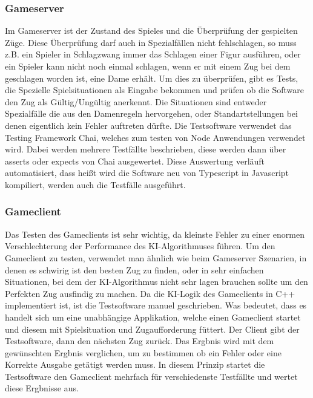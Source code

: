 \documentclass[12pt,a4paper,bibliography=totocnumbered,listof=totocnumbered]{article}
\begin{document}
\subsubsection{Gameserver}
Im Gameserver ist der Zustand des Spieles und die Überprüfung der gespielten Züge. Diese Überprüfung darf auch in Spezialfällen nicht fehlschlagen, so muss z.B. ein
Spieler in Schlagzwang immer das Schlagen einer Figur ausführen, oder ein Spieler kann nicht noch einmal schlagen, wenn er mit einem Zug bei dem geschlagen worden ist,
eine Dame erhält. Um dies zu überprüfen, gibt es Tests, die Spezielle Spielsituationen als Eingabe bekommen und prüfen ob die Software den Zug als Gültig/Ungültig
anerkennt. Die Situationen sind entweder Spezialfälle die aus den Damenregeln hervorgehen, oder Standartstellungen bei denen eigentlich kein Fehler auftreten dürfte.
Die Testsoftware verwendet das Testing Framework Chai, welches zum testen von Node Anwendungen verwendet wird. 
Dabei werden mehrere Testfällte beschrieben, diese werden dann über asserts oder expects von Chai ausgewertet. Diese Auswertung verläuft automatisiert,
dass heißt wird die Software neu von Typescript in Javascript kompiliert, werden auch die Testfälle ausgeführt.

\subsubsection{Gameclient}
Das Testen des Gameclients ist sehr wichtig, da kleinste Fehler zu einer enormen Verschlechterung der Performance des KI-Algorithmuses führen.
Um den Gameclient zu testen, verwendet man ähnlich wie beim Gameserver Szenarien, in denen es schwirig ist den besten Zug zu finden, oder 
in sehr einfachen Situationen, bei dem der KI-Algorithmus nicht sehr lagen brauchen sollte um den Perfekten Zug ausfindig zu machen.
Da die KI-Logik des Gameclients in C++ implementiert ist, ist die Testsoftware manuel geschrieben. 
Was bedeutet, dass es handelt sich um eine unabhängige Applikation, welche einen Gameclient startet und diesem mit Spielsituation und Zugaufforderung füttert.
Der Client gibt der Testsoftware, dann den nächsten Zug zurück. Das Ergbnis wird mit dem gewünschten Ergbnis verglichen, um zu bestimmen ob ein Fehler 
oder eine Korrekte Ausgabe getätigt werden muss. In diesem Prinzip startet die Testsoftware den Gameclient mehrfach für verschiedenste Testfällte und
wertet diese Ergbnisse aus.


\pagebreak
\end{document}
